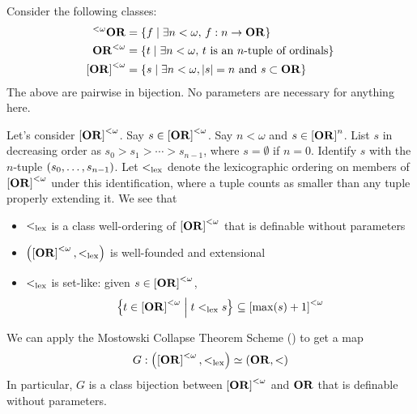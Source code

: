 \begin{boxexample}
    Consider the following classes:
    \begin{align*}
        ^{< \omega}\mathbf{OR} &= \left\{ f \; \middle\vert \; \exists n < \omega, \, f : n \to \mathbf{OR} \right\} \\
        \mathbf{OR}^{< \omega} &= \left\{ t \; \middle\vert \; \exists n < \omega, \, t \text{ is an $n$-tuple of ordinals} \right\} \\
        \left[ \mathbf{OR} \right]^{< \omega} &= \left\{ s \; \middle\vert \; \exists n < \omega , \left\lvert s \right\rvert = n \text{ and } s \subset \mathbf{OR} \right\}
    \end{align*}
    The above are pairwise in bijection. No parameters are necessary for anything here.

    Let's consider $\left[ \mathbf{OR} \right]^{< \omega}$. Say $s \in \left[ \mathbf{OR} \right]^{< \omega}$. Say $n < \omega$ and $s \in \left[ \mathbf{OR} \right]^{n}$. List $s$ in decreasing order as $s_0 > s_1 > \cdots > s_{n - 1}$, where $s = \emptyset$ if $n = 0$. Identify $s$ with the $n$-tuple $\left( s_0, \ldots, s_{n-1} \right)$. Let $<_{\operatorname{lex}}$ denote the lexicographic ordering on members of $\left[ \mathbf{OR} \right]^{< \omega}$ under this identification, where a tuple counts as smaller than any tuple properly extending it. We see that
    \begin{itemize}
        \item $<_{\operatorname{lex}}$ is a class well-ordering of $\left[ \mathbf{OR} \right]^{< \omega}$ that is definable without parameters
        \item $\left( \left[ \mathbf{OR} \right]^{<\omega}, <_{\operatorname{lex}} \right)$ is well-founded and extensional
        \item $<_{\operatorname{lex}}$ is set-like: given $s \in \left[ \mathbf{OR} \right]^{< \omega}$,
        \begin{align*}
            \left\{ t \in \left[ \mathbf{OR} \right]^{< \omega} \; \middle\vert \; t <_{\operatorname{lex}} s \right\} \subseteq \left[ \max(s) + 1 \right]^{< \omega}
        \end{align*}
    \end{itemize}
    We can apply the Mostowski Collapse Theorem Scheme () to get a map
    \begin{align*}
        G : \left( \left[ \mathbf{OR} \right]^{< \omega}, <_{\operatorname{lex}} \right) \simeq \left( \mathbf{OR}, < \right)
    \end{align*}
    In particular, $G$ is a class bijection between $\left[ \mathbf{OR} \right]^{< \omega}$ and $\mathbf{OR}$ that is definable without parameters.
\end{boxexample}

